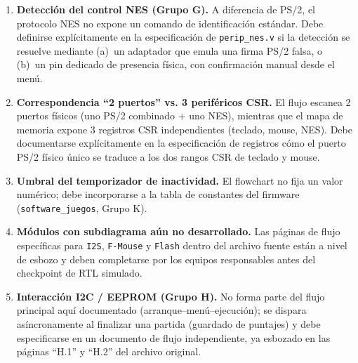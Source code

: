 \documentclass[11pt,a4paper]{article}
\begin{document}
\begin{enumerate}[leftmargin=1.4em]
    \item \textbf{Detecci\'on del control NES (Grupo G).} A diferencia de
    PS/2, el protocolo NES no expone un comando de identificaci\'on est\'andar.
    Debe definirse expl\'icitamente en la especificaci\'on de \texttt{perip\_nes.v}
    si la detecci\'on se resuelve mediante (a)~un adaptador que emula una
    firma PS/2 falsa, o (b)~un pin dedicado de presencia f\'isica, con
    confirmaci\'on manual desde el men\'u.
    \item \textbf{Correspondencia ``2 puertos'' vs. 3 perif\'ericos CSR.} El
    flujo escanea 2 puertos f\'isicos (uno PS/2 combinado + uno NES), mientras
    que el mapa de memoria expone 3 registros CSR independientes (teclado,
    mouse, NES). Debe documentarse expl\'icitamente en la especificaci\'on de
    registros c\'omo el puerto PS/2 f\'isico \'unico se traduce a los dos
    rangos CSR de teclado y mouse.
    \item \textbf{Umbral del temporizador de inactividad.} El flowchart no
    fija un valor num\'erico; debe incorporarse a la tabla de constantes del
    firmware (\texttt{software\_juegos}, Grupo K).
    \item \textbf{M\'odulos con subdiagrama a\'un no desarrollado.} Las
    p\'aginas de flujo espec\'ificas para \texttt{I2S}, \texttt{F-Mouse} y
    \texttt{Flash} dentro del archivo fuente est\'an a nivel de esbozo y deben
    completarse por los equipos responsables antes del checkpoint de RTL
    simulado.
    \item \textbf{Interacci\'on I2C / EEPROM (Grupo H).} No forma parte del
    flujo principal aqu\'i documentado (arranque--men\'u--ejecuci\'on); se
    dispara as\'incronamente al finalizar una partida (guardado de puntajes)
    y debe especificarse en un documento de flujo independiente, ya
    esbozado en las p\'aginas ``H.1'' y ``H.2'' del archivo original.
\end{enumerate}
\end{document}
